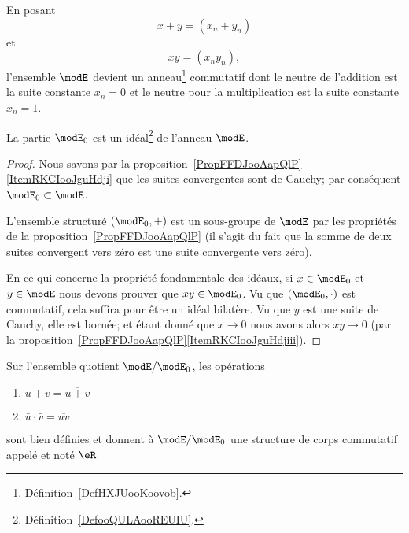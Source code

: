 En posant
\begin{equation}
    x+y=(x_n+y_n)
\end{equation}
et
\begin{equation}
    xy=(x_ny_n),
\end{equation}
l'ensemble \( \modE\) devient un anneau\footnote{Définition~\ref{DefHXJUooKoovob}.} commutatif dont le neutre de l'addition est la suite constante \( x_n=0\) et le neutre pour la multiplication est la suite constante \( x_n=1\).

\begin{proposition}
    La partie \( \modE_0\) est un idéal\footnote{Définition~\ref{DefooQULAooREUIU}.} de l'anneau \( \modE\).
\end{proposition}

\begin{proof}
    Nous savons par la proposition~\ref{PropFFDJooAapQlP}\ref{ItemRKCIooJguHdji} que les suites convergentes sont de Cauchy; par conséquent \( \modE_0\subset\modE\).

    L'ensemble structuré \( (\modE_0,+)\) est un sous-groupe de \( \modE\) par les propriétés de la proposition~\ref{PropFFDJooAapQlP} (il s'agit du fait que la somme de deux suites convergent vers zéro est une suite convergente vers zéro).

    En ce qui concerne la propriété fondamentale des idéaux, si \( x\in\modE_0\) et \( y\in\modE\) nous devons prouver que \( xy\in \modE_0\). Vu que \( (\modE_0,\cdot)\) est commutatif, cela suffira pour être un idéal bilatère. Vu que \( y\) est une suite de Cauchy, elle est bornée; et étant donné que \( x\to 0\) nous avons alors \( xy\to 0\) (par la proposition~\ref{PropFFDJooAapQlP}\ref{ItemRKCIooJguHdjiii}).
\end{proof}

\begin{theoremDef}       \label{DefooFKYKooOngSCB}
    Sur l'ensemble quotient \( \modE/\modE_0\), les opérations
    \begin{enumerate}
        \item
            \( \bar u+\bar v=\overline{ u+v }\)
        \item
            \( \bar u\cdot \bar v=\overline{ uv }\)
    \end{enumerate}
    sont bien définies et donnent à \( \modE/\modE_0\) une structure de corps commutatif appelé  et noté \( \eR\)
\end{theoremDef}


